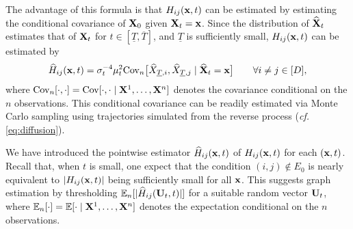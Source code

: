 \documentclass[11pt,a4paper,final]{article}
\numberwithin{equation}{section}
\theoremstyle{remark}
\newcommand{\bB}{{\bf B}}
\newcommand{\bff}{{\bf f}}
\newcommand{\bU}{{\bf U}}
\newcommand{\bx}{{\bf x}}
\newcommand{\bX}{{\bf X}}
\newcommand{\bZ}{{\bf Z}}
\newcommand{\bbE}{{\mathbb E}}
\newcommand{\cf}{{\it cf. }}
\newcommand{\be}{\begin{equation}}
\newcommand{\ee}{\end{equation}}
\newcommand{\bean}{\setlength\arraycolsep{1pt}\begin{eqnarray*}}
\newcommand{\eean}{\end{eqnarray*}}
\def\d{{\rm d}}
\begin{document}
The advantage of this formula is that $H_{ij}(\bx,t)$ can be estimated by estimating the conditional covariance of $\bX_{0}$ given $\bX_{t} = \bx$.
Since the distribution of $\widehat \bX_{t}$ estimates that of $\bX_{t}$ for $t \in [\underline{T}, \overline{T}]$, and $\underline T$ is sufficiently small, $H_{ij} (\bx,t)$ can be estimated by
\bean
\widehat H_{ij} (\bx,t) 
= \sigma_{t}^{-4} \mu_{t}^2 \text{Cov}_{n} \big[ \widehat X_{\underline{T}, i} , \widehat X_{\underline{T} ,j} \mid \widehat \bX_{t} = \bx \big]
\qquad \forall i \neq j \in [D],
\eean
where $\text{Cov}_{n} [ \cdot, \cdot] = \text{Cov}[\cdot,\cdot \mid \bX^{1}, \ldots, \bX^{n}]$ denotes the covariance conditional on the $n$ observations. This conditional covariance can be readily estimated via Monte Carlo sampling using trajectories simulated from the reverse process (\cf \eqref{eq:diffusion}).






We have introduced the pointwise estimator $\widehat H_{ij}(\bx, t)$ of $H_{ij}(\bx, t)$ for each $(\bx, t)$.
Recall that, when $t$ is small, one expect that the condition $(i, j) \notin E_{0}$ is nearly equivalent to $|H_{ij}(\bx, t)|$ being sufficiently small for all $\bx$.
This suggests graph estimation by thresholding $\bbE_n [\vert  \widehat H_{ij}(\bU_{t}, t) \vert ]$ for a suitable random vector $\bU_{t}$, where $\bbE_{n}[\cdot] = \bbE[\cdot \mid \bX^{1}, \ldots, \bX^{n}]$ denotes the expectation conditional on the $n$ observations.
\end{document}

